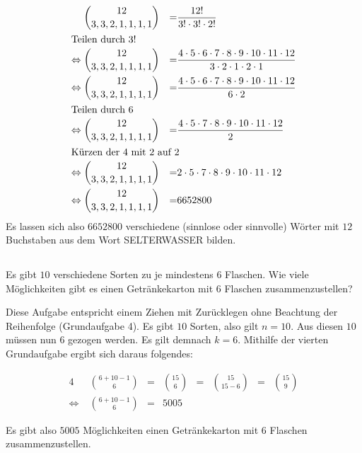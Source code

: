 \documentclass[10pt,a4paper,oneside,ngerman,numbers=noenddot]{scrartcl}
\begin{document}
\begin{alignat}{2}
&\; \binom{12}{3,3,2,1,1,1,1} &=& \frac{12!}{3! \cdot 3! \cdot 2!} \\
\intertext{Teilen durch $3!$}
\Leftrightarrow &\; \binom{12}{3,3,2,1,1,1,1} &=& \frac{4 \cdot 5 \cdot 6 \cdot 7 \cdot 8 \cdot 9 \cdot 10 \cdot 11 \cdot 12}{3 \cdot 2 \cdot 1 \cdot 2 \cdot 1} \\
\Leftrightarrow &\; \binom{12}{3,3,2,1,1,1,1} &=& \frac{4 \cdot 5 \cdot 6 \cdot 7 \cdot 8 \cdot 9 \cdot 10 \cdot 11 \cdot 12}{6 \cdot 2} \\
\intertext{Teilen durch $6$}
\Leftrightarrow &\; \binom{12}{3,3,2,1,1,1,1} &=& \frac{4 \cdot 5 \cdot 7 \cdot 8 \cdot 9 \cdot 10 \cdot 11 \cdot 12}{2} \\
\intertext{Kürzen der $4$ mit $2$ auf $2$}
\Leftrightarrow &\; \binom{12}{3,3,2,1,1,1,1} &=& 2 \cdot 5 \cdot 7 \cdot 8 \cdot 9 \cdot 10 \cdot 11 \cdot 12 \\
\Leftrightarrow &\; \binom{12}{3,3,2,1,1,1,1} &=& 6652800
\end{alignat}
Es lassen sich also $6652800$ verschiedene (sinnlose oder sinnvolle) Wörter mit $12$ Buchstaben aus dem Wort SELTERWASSER bilden.

\subsection{} %
Es gibt $10$ verschiedene Sorten zu je mindestens $6$ Flaschen. Wie viele Möglichkeiten gibt es einen Getränkekarton mit $6$ Flaschen zusammenzustellen?

Diese Aufgabe entspricht einem Ziehen mit Zurücklegen ohne Beachtung der Reihenfolge (Grundaufgabe 4). Es gibt $10$ Sorten, also gilt $n=10$. Aus diesen $10$ müssen nun $6$ gezogen werden. Es gilt demnach $k=6$. Mithilfe der vierten Grundaufgabe ergibt sich daraus folgendes:

\begin{alignat}{4}
&\; \binom{6+10-1}{6} &=& \binom{15}{6} &=& \binom{15}{15-6} &=& \binom{15}{9} \\
\Leftrightarrow &\; \binom{6+10-1}{6} &=& 5005
\end{alignat}

Es gibt also $5005$ Möglichkeiten einen Getränkekarton mit $6$ Flaschen zusammenzustellen.
\end{document}
